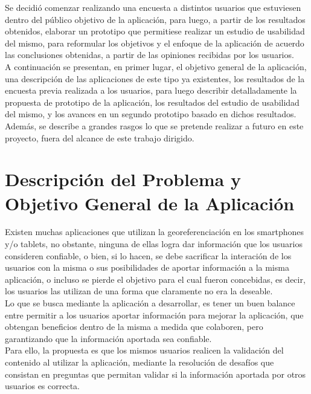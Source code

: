 \documentclass[10pt,letterpaper]{article}
\begin{document}
Se decidió comenzar realizando una encuesta a distintos usuarios que estuviesen dentro del público objetivo de la aplicación, para luego, a partir de los resultados obtenidos, elaborar un prototipo que permitiese realizar un estudio de usabilidad del mismo, para reformular los objetivos y el enfoque de la aplicación de acuerdo las conclusiones obtenidas, a partir de las opiniones recibidas por los usuarios.\\

A continuación se presentan, en primer lugar, el objetivo general de la aplicación, una descripción de las aplicaciones de este tipo ya existentes, los resultados de la encuesta previa realizada a los usuarios, para luego describir detalladamente la propuesta de prototipo de la aplicación, los resultados del estudio de usabilidad del mismo, y los avances en un segundo prototipo basado en dichos resultados. Además, se describe a grandes rasgos lo que se pretende realizar a futuro en este proyecto, fuera del alcance de este trabajo dirigido.\\

\newpage
\section{Descripción del Problema y Objetivo General de la Aplicación}

Existen muchas aplicaciones que utilizan la georeferenciación en los smartphones y/o tablets, no obstante, ninguna de ellas logra dar información que los usuarios consideren confiable, o bien, si lo hacen, se debe sacrificar la interación de los usuarios con la misma o sus posibilidades de aportar información a la misma aplicación, o incluso se pierde el objetivo para el cual fueron concebidas, es decir, los usuarios las utilizan de una forma que claramente no era la deseable.\\

Lo que se busca mediante la aplicación a desarrollar, es tener un buen balance entre permitir a los usuarios aportar información para mejorar la aplicación, que obtengan beneficios dentro de la misma a medida que colaboren, pero garantizando que la información aportada sea confiable.\\

Para ello, la propuesta es que los mismos usuarios realicen la validación del contenido al utilizar la aplicación, mediante la resolución de desafíos que consistan en preguntas que permitan validar si la información aportada por otros usuarios es correcta.\\
\end{document}

